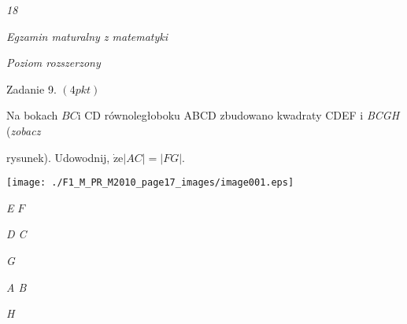 \documentclass[a4paper,12pt]{article}
\begin{document}
{\it 18}

{\it Egzamin maturalny z matematyki}

{\it Poziom rozszerzony}

Zadanie 9. $(4pkt)$

Na bokach $BC\mathrm{i}$ CD równoległoboku ABCD zbudowano kwadraty CDEF $\mathrm{i}$ {\it BCGH} ({\it zobacz}

rysunek). Udowodnij, $\dot{\mathrm{z}}\mathrm{e}|AC|=|FG|.$
\begin{center}
\texttt{[image: ./F1\_M\_PR\_M2010\_page17\_images/image001.eps]}
\end{center}
{\it E} $F$

{\it D  C}

{\it G}

{\it A  B}

{\it H}
\end{document}
